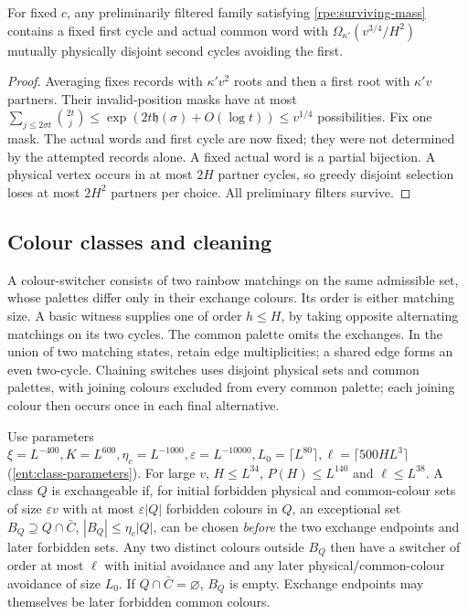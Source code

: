 \begin{lemma}\label{rpe:fan}
For fixed $c$, any preliminarily filtered family satisfying \eqref{rpe:surviving-mass} contains a fixed first cycle and actual common word with $\Omega_{\kappa'}(v^{3/4}/H^2)$ mutually physically disjoint second cycles avoiding the first.
\end{lemma}
\begin{proof}
Averaging fixes records with $\kappa'v^2$ roots and then a first root with $\kappa'v$ partners. Their invalid-position masks have at most $\sum_{j\le2\sigma{}t}\binom{2t}{j}\le\exp(2t\mathfrak{h}(\sigma)+O(\log{}t))\le{}v^{1/4}$ possibilities. Fix one mask. The actual words and first cycle are now fixed; they
were not determined by the attempted records alone. A fixed actual
word is a partial bijection. A physical vertex occurs in at most $2H$ partner cycles, so greedy disjoint selection loses at most $2H^2$ partners per choice. All preliminary filters survive.
\end{proof}

\subsection{Colour classes and cleaning}
\label{ent:classes-subsection}
A colour-switcher consists of two rainbow matchings on the same
admissible set, whose palettes differ only in their exchange colours.
Its order is either matching size. A basic witness supplies one of
order $h\le{}H$, by taking opposite alternating matchings on its two cycles. The common palette omits the exchanges. In the union of two matching states, retain edge multiplicities; a shared edge forms an even two-cycle. Chaining switches
uses disjoint physical sets and common palettes, with joining colours
excluded from every common palette; each joining colour then occurs
once in each final alternative.

Use parameters \label{ent:class-parameters}$\xi=L^{-400},K=L^{600},\eta_c=L^{-1000},\varepsilon=L^{-10000},L_0=\lceil{}L^{80}\rceil,\ell=\lceil500HL^3\rceil$ \textup{(\ref{ent:class-parameters})}. For large $v$, $H\le{}L^{34}$, $P(H)\le{}L^{140}$ and $\ell\le{}L^{38}$. A class $Q$ is exchangeable if, for initial forbidden physical and common-colour sets of size $\varepsilon{}v$ with at most $\varepsilon|Q|$ forbidden colours in $Q$, an exceptional set $B_Q\supseteq{}Q\cap\bar{C}$, $|B_Q|\le\eta_c|Q|$, can be chosen
\emph{before} the two exchange endpoints and later forbidden sets.
Any two distinct colours outside $B_Q$ then have a switcher of order at most $\ell$ with initial avoidance and any later physical/common-colour avoidance of size $L_0$. If $Q\cap\bar{C}=\varnothing$, $B_Q$ is empty. Exchange endpoints may themselves be later forbidden common colours.

